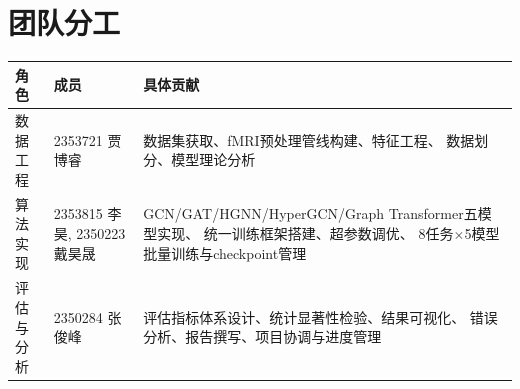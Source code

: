 \documentclass[12pt,a4paper,heading=true,fontset=windows]{ctexart}
\begin{document}
\section*{团队分工}

\vspace{0.5em}
\centering
\begin{tabularx}{\textwidth}{l L{3cm} X}
    \toprule
    \textbf{角色} & \textbf{成员}             & \textbf{具体贡献} \\
    \midrule
    数据工程        & 2353721 贾博睿             &
    数据集获取、fMRI预处理管线构建、特征工程、
    数据划分、模型理论分析                                           \\
    算法实现        & 2353815 李昊, 2350223 戴昊晟 &
    GCN/GAT/HGNN/HyperGCN/Graph Transformer五模型实现、
    统一训练框架搭建、超参数调优、
    8任务$\times$5模型批量训练与checkpoint管理                       \\
    评估与分析       & 2350284 张俊峰             &
    评估指标体系设计、统计显著性检验、结果可视化、
    错误分析、报告撰写、项目协调与进度管理                                   \\
    \bottomrule
\end{tabularx}

\vspace{1em}
\end{document}
